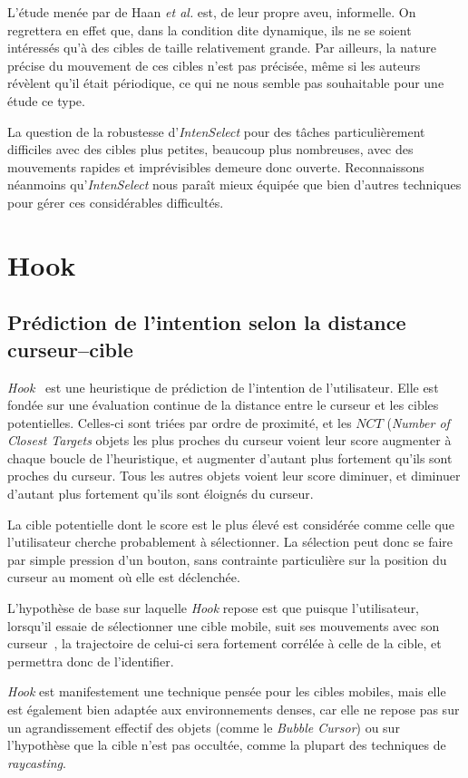 	L'étude menée par de Haan \emph{et al.} est, de leur propre aveu, informelle. On regrettera en effet que, dans la condition dite dynamique, ils ne se soient intéressés qu'à des cibles de taille relativement grande. Par ailleurs, la nature précise du mouvement de ces cibles n'est pas précisée, même si les auteurs révèlent qu'il était périodique, ce qui ne nous semble pas souhaitable pour une étude ce type.
	
	La question de la robustesse d'\emph{IntenSelect} pour des tâches particulièrement difficiles avec des cibles plus petites, beaucoup plus nombreuses, avec des mouvements rapides et imprévisibles demeure donc ouverte. Reconnaissons néanmoins qu'\emph{IntenSelect} nous paraît mieux équipée que bien d'autres techniques pour gérer ces considérables difficultés.
		
\section{Hook}
	\subsection{Prédiction de l'intention selon la distance curseur--cible}
	\emph{Hook}~\cite{ortega2013hook} est une heuristique de prédiction de l'intention de l'utilisateur. Elle est fondée sur une évaluation continue de la distance entre le curseur et les cibles potentielles. Celles-ci sont triées par ordre de proximité, et les $NCT$ (\emph{Number of Closest Targets} objets les plus proches du curseur voient leur score augmenter à chaque boucle de l'heuristique, et augmenter d'autant plus fortement qu'ils sont proches du curseur. Tous les autres objets voient leur score diminuer, et diminuer d'autant plus fortement qu'ils sont éloignés du curseur.
		
	La cible potentielle dont le score est le plus élevé est considérée comme celle que l'utilisateur cherche probablement à sélectionner. La sélection peut donc se faire par simple pression d'un bouton, sans contrainte particulière sur la position du curseur au moment où elle est déclenchée.

	L'hypothèse de base sur laquelle \emph{Hook} repose est que puisque l'utilisateur, lorsqu'il essaie de sélectionner une cible mobile, \og suit \fg{} ses mouvements avec son curseur~\cite{hasan2011comet}, la trajectoire de celui-ci sera fortement corrélée à celle de la cible, et permettra donc de l'identifier.
	
	\emph{Hook} est manifestement une technique pensée pour les cibles mobiles, mais elle est également bien adaptée aux environnements denses, car elle ne repose pas sur un agrandissement effectif des objets (comme le \emph{Bubble Cursor}) ou sur l'hypothèse que la cible n'est pas occultée, comme la plupart des techniques de \emph{raycasting}.
	
